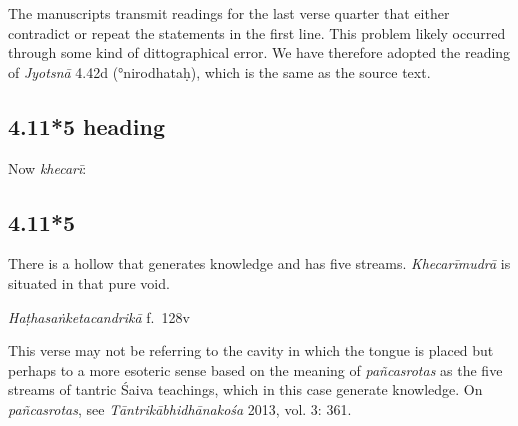 \begin{ekdosis}
\begin{philcomm}[hp04_011_4]
The manuscripts transmit readings for the last verse quarter that either contradict or repeat the statements in the first line. This problem likely occurred through some kind of dittographical error. We have therefore adopted the reading of \emph{Jyotsnā} 4.42d (°nirodhataḥ), which is the same as the source text. 
\end{philcomm}

\subsection*{4.11*5 heading}
\begin{translation}[hp04_011_5a]
Now \emph{khecarī}:
\end{translation}


\subsection*{4.11*5}
\begin{translation}[hp04_011_5]
There is a hollow that generates knowledge and has five streams. \emph{Khecarīmudrā} is situated in that pure void.
\end{translation}
%

\begin{testimonia}[hp04_011_5]
\emph{Haṭhasaṅketacandrikā} f.~128v
\begin{versinnote}
\end{versinnote}
\end{testimonia}

\begin{philcomm}[hp04_011_5]
This verse may not be referring to the cavity in which the tongue is placed but perhaps to a more esoteric sense based on the meaning of \textit{pañcasrotas} as the five streams of tantric Śaiva teachings, which in this case generate knowledge. On \textit{pañcasrotas}, see \emph{Tāntrikābhidhānakośa} 2013, vol. 3: 361.
\end{philcomm}


\end{ekdosis}
